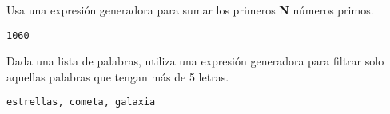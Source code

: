\begin{exercise} Usa una expresión generadora para sumar los primeros \textbf{N} números primos.
\begin{Shaded}
\begin{Highlighting}[]
    \OperatorTok{\textgreater{}}   \OperatorTok{\%}\OperatorTok{!=}   \NormalTok{(}\NormalTok{, }\OperatorTok{**}\NormalTok{) }\OperatorTok{+} \NormalTok{))}

\OperatorTok{=} 
\OperatorTok{=}  \NormalTok{(}\NormalTok{, }\NormalTok{) }
\end{Highlighting}
\end{Shaded}

\begin{verbatim}
1060

\end{verbatim}
\end{exercise}

\begin{exercise} Dada una lista de palabras, utiliza una expresión generadora para filtrar solo aquellas palabras que tengan más de 5 letras.
\begin{Shaded}
\begin{Highlighting}[]
\OperatorTok{=}\NormalTok{ [}\NormalTok{, }\NormalTok{, }\NormalTok{, }\NormalTok{, }\NormalTok{]}
\OperatorTok{=} \OperatorTok{\textgreater{}} \NormalTok{)}
\NormalTok{(}\OperatorTok{*}\OperatorTok{=}\NormalTok{)  }
\end{Highlighting}
\end{Shaded}

\begin{verbatim}
estrellas, cometa, galaxia

\end{verbatim}
\end{exercise}

